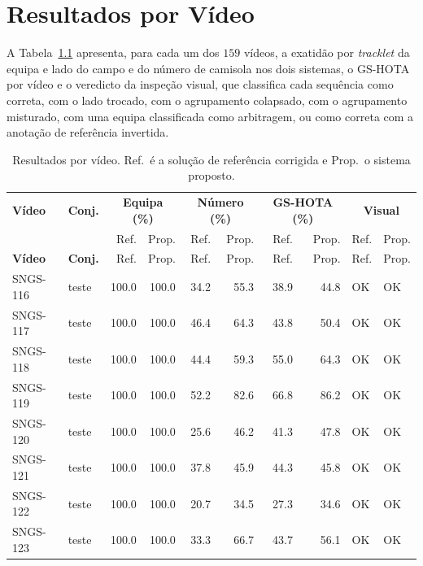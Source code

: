 \chapter{Resultados por Vídeo}\label{anexo:videos}
\setcounter{table}{0}

A Tabela~\ref{tab:anexo-videos} apresenta, para cada um dos $159$ vídeos, a exatidão por \emph{tracklet} da equipa e lado do campo e do número de camisola nos dois sistemas, o GS-HOTA por vídeo e o veredicto da inspeção visual, que classifica cada sequência como correta, com o lado trocado, com o agrupamento colapsado, com o agrupamento misturado, com uma equipa classificada como arbitragem, ou como correta com a anotação de referência invertida.

\begin{small}
\begin{longtable}{|l|l|r|r|r|r|r|r|l|l|}
\caption{Resultados por vídeo. Ref.\ é a solução de referência corrigida e Prop.\ o sistema proposto.}\label{tab:anexo-videos}\\
\hline \textbf{Vídeo} & \textbf{Conj.} & \multicolumn{2}{|c|}{\textbf{Equipa (\%)}} & \multicolumn{2}{|c|}{\textbf{Número (\%)}} & \multicolumn{2}{|c|}{\textbf{GS-HOTA (\%)}} & \multicolumn{2}{|c|}{\textbf{Visual}} \\
 & & Ref. & Prop. & Ref. & Prop. & Ref. & Prop. & Ref. & Prop. \\ \hline
\endfirsthead
\hline \textbf{Vídeo} & \textbf{Conj.} & Ref. & Prop. & Ref. & Prop. & Ref. & Prop. & Ref. & Prop. \\ \hline
\endhead
\hline
\endfoot
SNGS-116 & teste & 100.0 & 100.0 & 34.2 & 55.3 & 38.9 & 44.8 & OK & OK \\ \hline
SNGS-117 & teste & 100.0 & 100.0 & 46.4 & 64.3 & 43.8 & 50.4 & OK & OK \\ \hline
SNGS-118 & teste & 100.0 & 100.0 & 44.4 & 59.3 & 55.0 & 64.3 & OK & OK \\ \hline
SNGS-119 & teste & 100.0 & 100.0 & 52.2 & 82.6 & 66.8 & 86.2 & OK & OK \\ \hline
SNGS-120 & teste & 100.0 & 100.0 & 25.6 & 46.2 & 41.3 & 47.8 & OK & OK \\ \hline
SNGS-121 & teste & 100.0 & 100.0 & 37.8 & 45.9 & 44.3 & 45.8 & OK & OK \\ \hline
SNGS-122 & teste & 100.0 & 100.0 & 20.7 & 34.5 & 27.3 & 34.6 & OK & OK \\ \hline
SNGS-123 & teste & 100.0 & 100.0 & 33.3 & 66.7 & 43.7 & 56.1 & OK & OK \\ \hline

\end{longtable}
\end{small}
